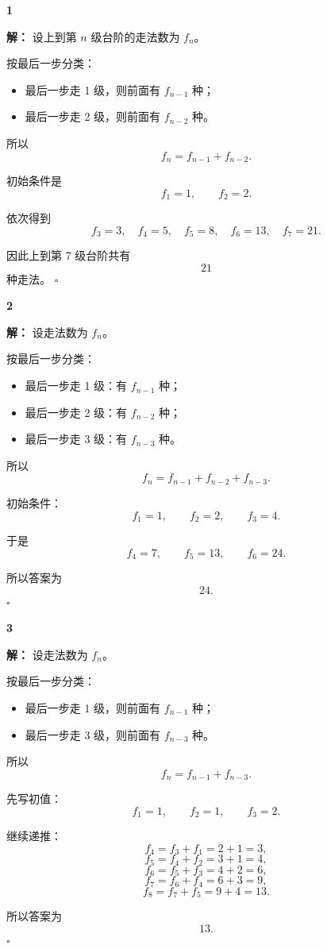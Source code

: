 \documentclass[11pt,a4paper,fontset=fandol]{ctexart}
\theoremstyle{formalexample}
\newenvironment{solution}{\par\noindent\textbf{解：}}{\hfill$\square$\par}
\begin{document}
\textbf{1}\begin{solution}
设上到第 $n$ 级台阶的走法数为 $f_n$。

按最后一步分类：
\begin{itemize}
  \item 最后一步走 1 级，则前面有 $f_{n-1}$ 种；
  \item 最后一步走 2 级，则前面有 $f_{n-2}$ 种。
\end{itemize}

所以
\[
  f_n=f_{n-1}+f_{n-2}.
\]

初始条件是
\[
  f_1=1,\qquad f_2=2.
\]

依次得到
\[
  f_3=3,\quad f_4=5,\quad f_5=8,\quad f_6=13,\quad f_7=21.
\]

因此上到第 7 级台阶共有
\[
  21
\]
种走法。
\end{solution}

\textbf{2}\begin{solution}
设走法数为 $f_n$。

按最后一步分类：
\begin{itemize}
  \item 最后一步走 1 级：有 $f_{n-1}$ 种；
  \item 最后一步走 2 级：有 $f_{n-2}$ 种；
  \item 最后一步走 3 级：有 $f_{n-3}$ 种。
\end{itemize}

所以
\[
  f_n=f_{n-1}+f_{n-2}+f_{n-3}.
\]

初始条件：
\[
  f_1=1,\qquad f_2=2,\qquad f_3=4.
\]

于是
\[
  f_4=7,\qquad f_5=13,\qquad f_6=24.
\]

所以答案为
\[
  24.
\]
\end{solution}

\textbf{3}\begin{solution}
设走法数为 $f_n$。

按最后一步分类：
\begin{itemize}
  \item 最后一步走 1 级，则前面有 $f_{n-1}$ 种；
  \item 最后一步走 3 级，则前面有 $f_{n-3}$ 种。
\end{itemize}

所以
\[
  f_n=f_{n-1}+f_{n-3}.
\]

先写初值：
\[
  f_1=1,
  \qquad
  f_2=1,
  \qquad
  f_3=2.
\]

继续递推：
\[
  f_4=f_3+f_1=2+1=3,
\]
\[
  f_5=f_4+f_2=3+1=4,
\]
\[
  f_6=f_5+f_3=4+2=6,
\]
\[
  f_7=f_6+f_4=6+3=9,
\]
\[
  f_8=f_7+f_5=9+4=13.
\]

所以答案为
\[
  13.
\]
\end{solution}
\end{document}
